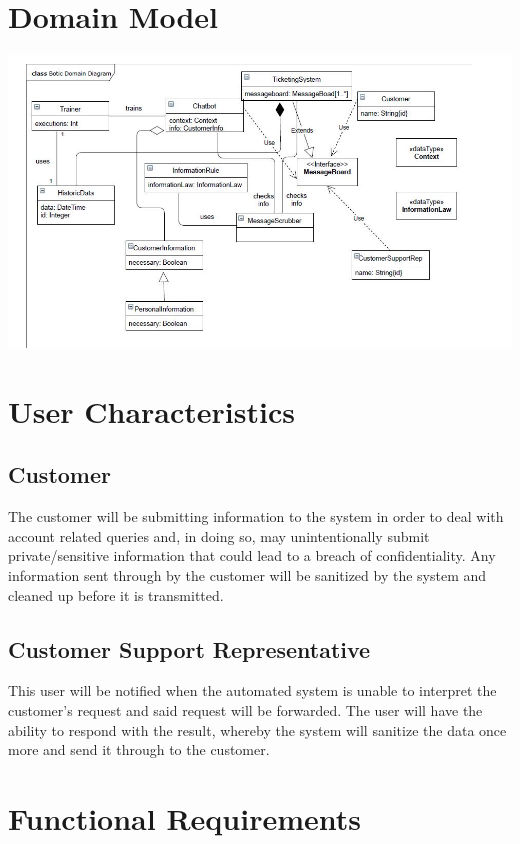 \documentclass[11pt]{article}
\begin{document}
\section{Domain Model}

 \includegraphics[width=1.0\textwidth]{../../images/Botic_Domain_Diagram.jpg}
 
\section{User Characteristics}
\subsection{Customer}
The customer will be submitting information to the system in order to deal with account related queries and, in doing so, may unintentionally submit private/sensitive information that could lead to a breach of confidentiality. Any information sent through by the customer will be sanitized by the system and cleaned up before it is transmitted.
\subsection{Customer Support Representative}
This user will be notified when the automated system is unable to interpret the customer's request and said request will be forwarded. The user will have the ability to respond with the result, whereby the system will sanitize the data once more and send it through to the customer.

\section{Functional Requirements}
\end{document}

